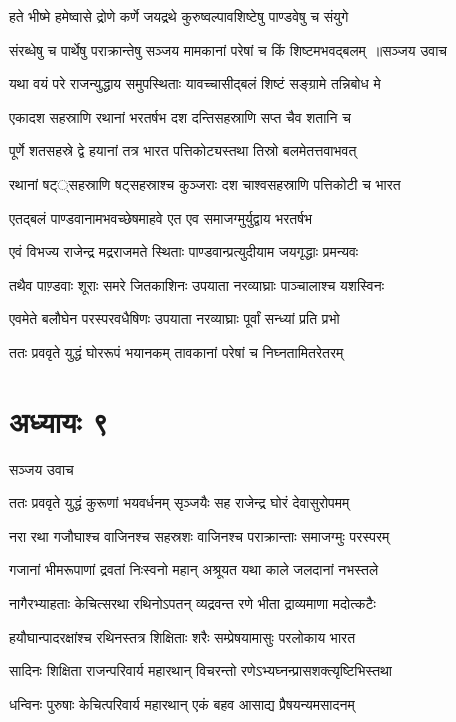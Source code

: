 \twolineshloka
{हते भीष्मे हमेष्वासे द्रोणे कर्णे जयद्रथे}
{कुरुष्वल्पावशिष्टेषु पाण्डवेषु च संयुगे}


\threelineshloka
{संरब्धेषु च पार्थेषु पराक्रान्तेषु सञ्जय}
{मामकानां परेषां च किं शिष्टमभवद्बलम् ॥सञ्जय उवाच}
{}


\twolineshloka
{यथा वयं परे राजन्युद्धाय समुपस्थिताः}
{यावच्चासीद्बलं शिष्टं सङ्ग्रामे तन्निबोध मे}


\twolineshloka
{एकादश सहस्राणि रथानां भरतर्षभ}
{दश दन्तिसहस्राणि सप्त चैव शतानि च}


\twolineshloka
{पूर्णे शतसहस्रे द्वे हयानां तत्र भारत}
{पत्तिकोट्यस्तथा तिस्रो बलमेतत्तवाभवत्}


\twolineshloka
{रथानां षट््सहस्राणि षट्सहस्राश्च कुञ्जराः}
{दश चाश्वसहस्राणि पत्तिकोटी च भारत}


\twolineshloka
{एतद्बलं पाण्डवानामभवच्छेषमाहवे}
{एत एव समाजग्मुर्युद्वाय भरतर्षभ}


\twolineshloka
{एवं विभज्य राजेन्द्र मद्रराजमते स्थिताः}
{पाण्डवान्प्रत्युदीयाम जयगृद्धाः प्रमन्यवः}


\twolineshloka
{तथैव पाण़्डवाः शूराः समरे जितकाशिनः}
{उपयाता नरव्याघ्राः पाञ्चालाश्च यशस्विनः}


\twolineshloka
{एवमेते बलौघेन परस्परवधैषिणः}
{उपयाता नरव्याघ्राः पूर्वां सन्ध्यां प्रति प्रभो}


\twolineshloka
{ततः प्रववृते युद्धं घोररूपं भयानकम्}
{तावकानां परेषां च निघ्नतामितरेतरम्}


\chapter{अध्यायः ९}
\twolineshloka
{सञ्जय उवाच}
{}


\twolineshloka
{ततः प्रववृते युद्धं कुरूणां भयवर्धनम्}
{सृञ्जयैः सह राजेन्द्र घोरं देवासुरोपमम्}


\twolineshloka
{नरा रथा गजौघाश्च वाजिनश्च सहस्रशः}
{वाजिनश्च पराक्रान्ताः समाजग्मुः परस्परम्}


\twolineshloka
{गजानां भीमरूपाणां द्रवतां निःस्वनो महान्}
{अश्रूयत यथा काले जलदानां नभस्तले}


\twolineshloka
{नागैरभ्याहताः केचित्सरथा रथिनोऽपतन्}
{व्यद्रवन्त रणे भीता द्राव्यमाणा मदोत्कटैः}


\twolineshloka
{हयौघान्पादरक्षांश्च रथिनस्तत्र शिक्षिताः}
{शरैः सम्प्रेषयामासुः परलोकाय भारत}


\twolineshloka
{सादिनः शिक्षिता राजन्परिवार्य महारथान्}
{विचरन्तो रणेऽभ्यघ्नन्प्रासशक्त्यृष्टिभिस्तथा}


\twolineshloka
{धन्विनः पुरुषाः केचित्परिवार्य महारथान्}
{एकं बहव आसाद्य प्रैषयन्यमसादनम्}


